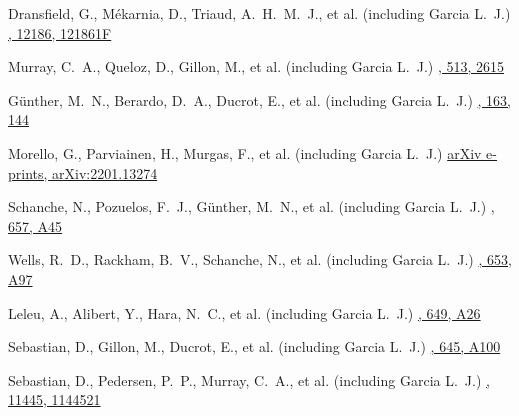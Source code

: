 {Dransfield, G., M{\'e}karnia, D., Triaud, A.~H.~M.~J., et al. (including Garcia L.~J.)}
{\href{https://ui.adsabs.harvard.edu/abs/2022SPIE12186E..1FD}{\procspie, 12186, 121861F}}

{Murray, C.~A., Queloz, D., Gillon, M., et al. (including Garcia L.~J.)}
{\href{https://ui.adsabs.harvard.edu/abs/2022MNRAS.513.2615M}{\mnras, 513, 2615}}

{G{\"u}nther, M.~N., Berardo, D.~A., Ducrot, E., et al. (including Garcia L.~J.)}
{\href{https://ui.adsabs.harvard.edu/abs/2022AJ....163..144G}{\aj, 163, 144}}

{Morello, G., Parviainen, H., Murgas, F., et al. (including Garcia L.~J.)}
{\href{https://ui.adsabs.harvard.edu/abs/2022arXiv220113274M}{arXiv e-prints, arXiv:2201.13274}}

{Schanche, N., Pozuelos, F.~J., G{\"u}nther, M.~N., et al. (including Garcia L.~J.)}
{\href{https://ui.adsabs.harvard.edu/abs/2022A\&A...657A..45S}{\aap, 657, A45}}

{Wells, R.~D., Rackham, B.~V., Schanche, N., et al. (including Garcia L.~J.)}
{\href{https://ui.adsabs.harvard.edu/abs/2021A\&A...653A..97W}{\aap, 653, A97}}

{Leleu, A., Alibert, Y., Hara, N.~C., et al. (including Garcia L.~J.)}
{\href{https://ui.adsabs.harvard.edu/abs/2021A\&A...649A..26L}{\aap, 649, A26}}

{Sebastian, D., Gillon, M., Ducrot, E., et al. (including Garcia L.~J.)}
{\href{https://ui.adsabs.harvard.edu/abs/2021A\&A...645A.100S}{\aap, 645, A100}}

{Sebastian, D., Pedersen, P.~P., Murray, C.~A., et al. (including Garcia L.~J.)}
{\href{https://ui.adsabs.harvard.edu/abs/2020SPIE11445E..21S}{\procspie, 11445, 1144521}}

